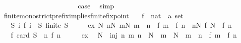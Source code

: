 \begin{isabellebody}
\ \ \ \ \isamarkupfalse%
\isanewline
\ \ \ \ \ \ \isamarkupfalse%
\ {}\isanewline
\ \ \ \ \ \ \isamarkupfalse%
\ \isamarkupfalse%
\ {\isacharquery}{\kern0pt}case\ \isamarkupfalse%
\ simp\isanewline
\ \ \ \ \isamarkupfalse%
\isanewline
\ \ \isamarkupfalse%
\isanewline
{}\isamarkupfalse%
%
\endisatagproof
{\isafoldproof}%
%
\isadelimproof
\isanewline
%
\endisadelimproof
\isanewline
{}\isamarkupfalse%
\ finite{\isacharunderscore}{\kern0pt}mono{\isacharunderscore}{\kern0pt}strict{\isacharunderscore}{\kern0pt}prefix{\isacharunderscore}{\kern0pt}implies{\isacharunderscore}{\kern0pt}finite{\isacharunderscore}{\kern0pt}fixpoint{\isacharcolon}{\kern0pt}\isanewline
\ \ \ f\ {\isacharcolon}{\kern0pt}{\isacharcolon}{\kern0pt}\ {\isachardoublequoteopen}nat\ {\isasymRightarrow}\ {\isacharprime}{\kern0pt}a\ set{\isachardoublequoteclose}\isanewline
\ \ \ S{\isacharcolon}{\kern0pt}\ {\isachardoublequoteopen}{\isasymAnd}i{\isachardot}{\kern0pt}\ f\ i\ {\isasymsubseteq}\ S{\isachardoublequoteclose}\ {\isachardoublequoteopen}finite\ S{\isachardoublequoteclose}\isanewline
\ \ \ \ \ ex{\isacharcolon}{\kern0pt}\ {\isachardoublequoteopen}{\isasymexists}N{\isachardot}{\kern0pt}\ {\isacharparenleft}{\kern0pt}{\isasymforall}n{\isasymle}N{\isachardot}{\kern0pt}\ {\isasymforall}m{\isasymle}N{\isachardot}{\kern0pt}\ m\ {\isacharless}{\kern0pt}\ n\ {\isasymlongrightarrow}\ f\ m\ {\isasymsubset}\ f\ n{\isacharparenright}{\kern0pt}\ {\isasymand}\ {\isacharparenleft}{\kern0pt}{\isasymforall}n{\isasymge}N{\isachardot}{\kern0pt}\ f\ N\ {\isacharequal}{\kern0pt}\ f\ n{\isacharparenright}{\kern0pt}{\isachardoublequoteclose}\isanewline
\ \ \ {\isachardoublequoteopen}f\ {\isacharparenleft}{\kern0pt}card\ S{\isacharparenright}{\kern0pt}\ {\isacharequal}{\kern0pt}\ {\isacharparenleft}{\kern0pt}{\isasymUnion}n{\isachardot}{\kern0pt}\ f\ n{\isacharparenright}{\kern0pt}{\isachardoublequoteclose}\isanewline
%
\isadelimproof
%
\endisadelimproof
%
\isatagproof
{}\isamarkupfalse%
\ {\isacharminus}{\kern0pt}\isanewline
\ \ \isamarkupfalse%
\ ex\ \isamarkupfalse%
\ N\ \ inj{\isacharcolon}{\kern0pt}\ {\isachardoublequoteopen}{\isasymAnd}n\ m{\isachardot}{\kern0pt}\ n\ {\isasymle}\ N\ {\isasymLongrightarrow}\ m\ {\isasymle}\ N\ {\isasymLongrightarrow}\ m\ {\isacharless}{\kern0pt}\ n\ {\isasymLongrightarrow}\ f\ m\ {\isasymsubset}\ f\ n{\isachardoublequoteclose}\isanewline

\end{isabellebody}
